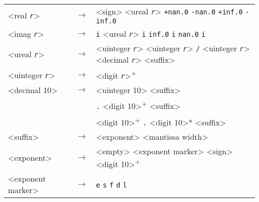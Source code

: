 {\begin{tabular}[H]{lcl}
\textless{}real \texttt{\textit{r}}\textgreater{} & \(\longrightarrow\) & \textless{}sign\textgreater{} \textless{}ureal \texttt{\textit{r}}\textgreater{} \textbar{} \texttt{+nan.0} \textbar{} \texttt{-nan.0} \textbar{} \texttt{+inf.0} \textbar{} \texttt{-inf.0} \\

\textless{}imag \texttt{\textit{r}}\textgreater{} & \(\longrightarrow\) & \texttt{i} \textbar{} \textless{}ureal \texttt{\textit{r}}\textgreater{} \texttt{i} \textbar{} \texttt{inf.0} \texttt{i} \textbar{} \texttt{nan.0} \texttt{i} \\

\textless{}ureal \texttt{\textit{r}}\textgreater{} & \(\longrightarrow\) & \textless{}uinteger \texttt{\textit{r}}\textgreater{} \textbar{} \textless{}uinteger \texttt{\textit{r}}\textgreater{} \texttt{/} \textless{}uinteger \texttt{\textit{r}}\textgreater{} \textbar{} \textless{}decimal \texttt{\textit{r}}\textgreater{} \textless{}suffix\textgreater{} \\

\textless{}uinteger \texttt{\textit{r}}\textgreater{} & \(\longrightarrow\) & \textless{}digit \texttt{\textit{r}}\textgreater{}\textsuperscript{+} \\

\textless{}decimal 10\textgreater{} & \(\longrightarrow\) & \textless{}uinteger 10\textgreater{} \textless{}suffix\textgreater{} \\

  & \textbar{} & \texttt{.} \textless{}digit 10\textgreater{}\textsuperscript{+} \textless{}suffix\textgreater{} \\

  & \textbar{} & \textless{}digit 10\textgreater{}\textsuperscript{+} \texttt{.} \textless{}digit 10\textgreater{}* \textless{}suffix\textgreater{} \\

\textless{}suffix\textgreater{} & \(\longrightarrow\) & \textless{}exponent\textgreater{} \textless{}mantissa width\textgreater{} \\

\textless{}exponent\textgreater{} & \(\longrightarrow\) & \textless{}empty\textgreater{} \textbar{} \textless{}exponent marker\textgreater{} \textless{}sign\textgreater{} \textless{}digit 10\textgreater{}\textsuperscript{+} \\

\textless{}exponent marker\textgreater{} & \(\longrightarrow\) & \texttt{e} \textbar{} \texttt{s} \textbar{} \texttt{f}
                 \textbar{} \texttt{d} \textbar{} \texttt{l} \\


\end{tabular}}
